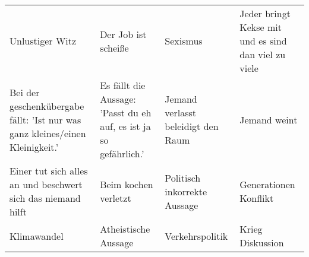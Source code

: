 \begin{tabular}{llll}
\toprule
\midrule
Unlustiger Witz & Der Job ist scheiße & Sexismus & Jeder bringt Kekse mit und es sind dan viel zu viele \\
Bei der geschenkübergabe fällt: 'Ist nur was ganz kleines/einen Kleinigkeit.' & Es fällt die Aussage: 'Passt du eh auf, es ist ja so gefährlich.' & Jemand verlasst beleidigt den Raum & Jemand weint \\
Einer tut sich alles an und beschwert sich das niemand hilft & Beim kochen verletzt & Politisch inkorrekte Aussage & Generationen Konflikt \\
Klimawandel & Atheistische Aussage & Verkehrspolitik & Krieg Diskussion \\
\bottomrule
\end{tabular}
